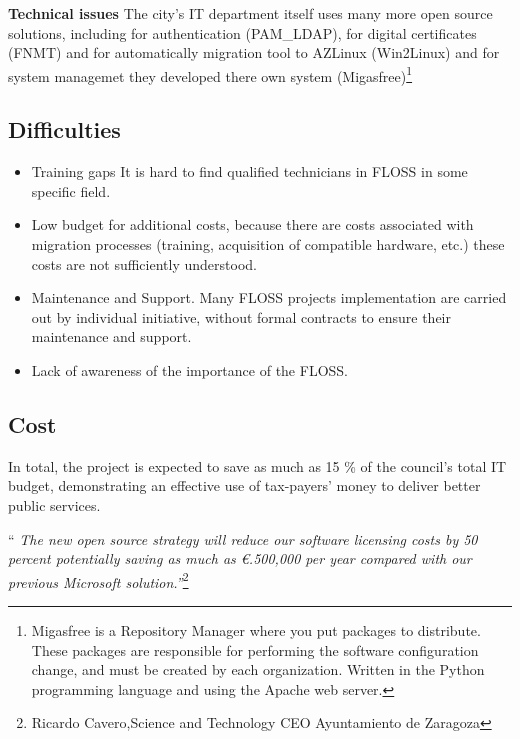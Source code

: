 \textbf{Technical issues}
The city's IT department itself uses many more open source solutions, including for authentication (PAM\_LDAP), for digital certificates (FNMT) and for automatically migration tool to AZLinux (Win2Linux) and for system managemet they developed there own system (Migasfree)\footnote{Migasfree is a Repository Manager where you put packages to distribute. These packages are responsible for performing the software configuration change, and must be created by each organization. Written in the Python programming language and using the Apache web server.}

\subsection{Difficulties}
\begin{itemize}
\item Training gaps
It is hard to find qualified technicians in FLOSS in some specific field.
\item Low budget for additional costs, because there are costs associated with migration processes (training, acquisition of compatible hardware, etc.) these costs are not sufficiently understood.
\item Maintenance and Support. Many FLOSS projects implementation are carried out by individual initiative, without formal contracts to ensure their maintenance and support.
\item Lack of awareness of the importance of the FLOSS.
\end{itemize}


\subsection{Cost}
In total, the project is expected to save as much as 15 \% of the council’s total IT budget, demonstrating an effective use of tax-payers’ money to deliver better public services.

“\textit{ The new open source strategy will reduce our software licensing costs by 50 percent potentially saving as much as \euro.500,000  per
year compared with our previous Microsoft solution.”}\footnote{Ricardo Cavero,Science and Technology CEO
Ayuntamiento de Zaragoza}

\newpage


